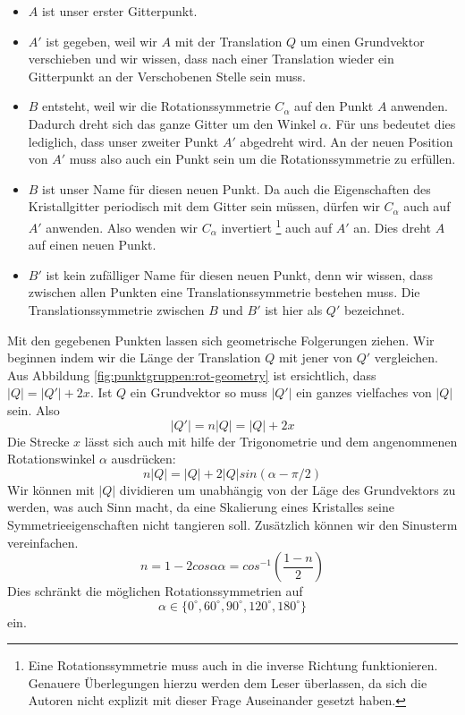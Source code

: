  \begin{itemize}
     \item  $A$ ist unser erster Gitterpunkt. 
            
     \item  $A'$ ist gegeben, weil wir $A$ mit der Translation $Q$ um einen Grundvektor verschieben und wir wissen, 
            dass nach einer Translation wieder ein Gitterpunkt an der Verschobenen Stelle sein muss.           
     \item $B$ entsteht, weil wir die Rotationssymmetrie $C_\alpha$ auf den Punkt $A$ anwenden.
            Dadurch dreht sich das ganze Gitter um den Winkel $\alpha$. 
            Für uns bedeutet dies lediglich, dass unser zweiter Punkt $A'$ abgedreht wird.
            An der neuen Position von $A'$ muss also auch ein Punkt sein um die Rotationssymmetrie zu erfüllen.
      \item $B$ ist unser Name für diesen neuen Punkt. 
            Da auch die Eigenschaften des Kristallgitter periodisch mit dem Gitter sein müssen, dürfen wir $C_\alpha$ auch auf $A'$ anwenden.
            Also wenden wir $C_\alpha$ invertiert
            \footnote{Eine Rotationssymmetrie muss auch in die inverse Richtung funktionieren. 
            Genauere Überlegungen hierzu werden dem Leser überlassen, da sich die Autoren nicht explizit mit dieser Frage Auseinander gesetzt haben.} 
            auch auf $A'$ an. 
            Dies dreht $A$ auf einen neuen Punkt.
     \item $B'$ ist kein zufälliger Name für diesen neuen Punkt, denn wir wissen, dass zwischen allen Punkten eine Translationssymmetrie bestehen muss.
            Die Translationssymmetrie zwischen $B$ und $B'$ ist hier als $Q'$ bezeichnet.
 \end{itemize}  
 Mit den gegebenen Punkten lassen sich geometrische Folgerungen ziehen.
 Wir beginnen indem wir die Länge der Translation $Q$ mit jener von $Q'$ vergleichen.
 Aus Abbildung \ref{fig:punktgruppen:rot-geometry} ist ersichtlich, dass $|Q| = |Q'|+ 2x$.
 Ist $Q$ ein Grundvektor so muss $|Q'|$ ein ganzes vielfaches von $|Q|$ sein. Also 
 \[
    |Q'| = n|Q| = |Q| + 2x
 \]
 Die Strecke $x$ lässt sich auch mit hilfe der Trigonometrie und dem angenommenen Rotationswinkel $\alpha$ ausdrücken:
 \[
    n|Q| = |Q| + 2|Q|sin(\alpha - \pi/2)
 \]
 Wir können mit $|Q|$ dividieren um unabhängig von der Läge des Grundvektors zu werden, 
 was auch Sinn macht, da eine Skalierung eines Kristalles seine Symmetrieeigenschaften nicht tangieren soll. 
 Zusätzlich können wir den Sinusterm vereinfachen.
 \[
     n = 1 - 2cos\alpha
     \alpha = cos^{-1}(\frac{1-n}{2})
 \]
 Dies  schränkt die möglichen Rotationssymmetrien auf 
 \[
     \alpha \in \{ 0^\circ, 60^\circ, 90^\circ, 120^\circ, 180^\circ\}
 \]
ein.

